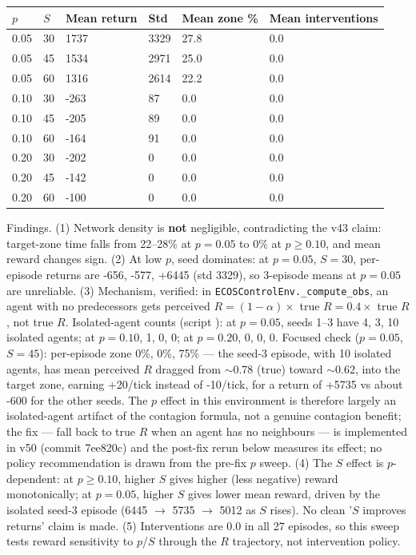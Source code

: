\documentclass[11pt]{article}
\begin{document}
\begin{table}[htbp]
\centering
\begin{tabular}{llllll}
\toprule
\textbf{$p$} & \textbf{$S$} & \textbf{Mean return} & \textbf{Std} & \textbf{Mean zone \%} & \textbf{Mean interventions} \\
\midrule
0.05 & 30 & 1737 & 3329 & 27.8 & 0.0 \\
0.05 & 45 & 1534 & 2971 & 25.0 & 0.0 \\
0.05 & 60 & 1316 & 2614 & 22.2 & 0.0 \\
0.10 & 30 & -263 & 87 & 0.0 & 0.0 \\
0.10 & 45 & -205 & 89 & 0.0 & 0.0 \\
0.10 & 60 & -164 & 91 & 0.0 & 0.0 \\
0.20 & 30 & -202 & 0 & 0.0 & 0.0 \\
0.20 & 45 & -142 & 0 & 0.0 & 0.0 \\
0.20 & 60 & -100 & 0 & 0.0 & 0.0 \\
\bottomrule
\end{tabular}
\end{table}

Findings. (1) Network density is \textbf{not} negligible, contradicting the v43 claim: target-zone time falls from 22--28\% at $p=0.05$ to 0\% at $p \geq 0.10$, and mean reward changes sign. (2) At low $p$, seed dominates: at $p=0.05$, $S=30$, per-episode returns are -656, -577, +6445 (std 3329), so 3-episode means at $p=0.05$ are unreliable. (3) Mechanism, verified: in \texttt{ECOSControlEnv.\_compute\_obs}, an agent with no predecessors gets perceived $R = (1-\alpha) \times$ true $R = 0.4 \times$ true $R$, not true $R$. Isolated-agent counts (script ): at $p=0.05$, seeds 1--3 have 4, 3, 10 isolated agents; at $p=0.10$, 1, 0, 0; at $p=0.20$, 0, 0, 0. Focused check ($p=0.05$, $S=45$): per-episode zone 0\%, 0\%, 75\% --- the seed-3 episode, with 10 isolated agents, has mean perceived $R$ dragged from $\sim$0.78 (true) toward $\sim$0.62, into the target zone, earning +20/tick instead of -10/tick, for a return of +5735 vs about -600 for the other seeds. The $p$ effect in this environment is therefore largely an isolated-agent artifact of the contagion formula, not a genuine contagion benefit; the fix --- fall back to true $R$ when an agent has no neighbours --- is implemented in v50 (commit 7ee820c) and the post-fix rerun below measures its effect; no policy recommendation is drawn from the pre-fix $p$ sweep. (4) The $S$ effect is $p$-dependent: at $p \geq 0.10$, higher $S$ gives higher (less negative) reward monotonically; at $p=0.05$, higher $S$ gives lower mean reward, driven by the isolated seed-3 episode (6445 $\rightarrow$ 5735 $\rightarrow$ 5012 as $S$ rises). No clean '$S$ improves returns' claim is made. (5) Interventions are 0.0 in all 27 episodes, so this sweep tests reward sensitivity to $p$/$S$ through the $R$ trajectory, not intervention policy.
\end{document}
